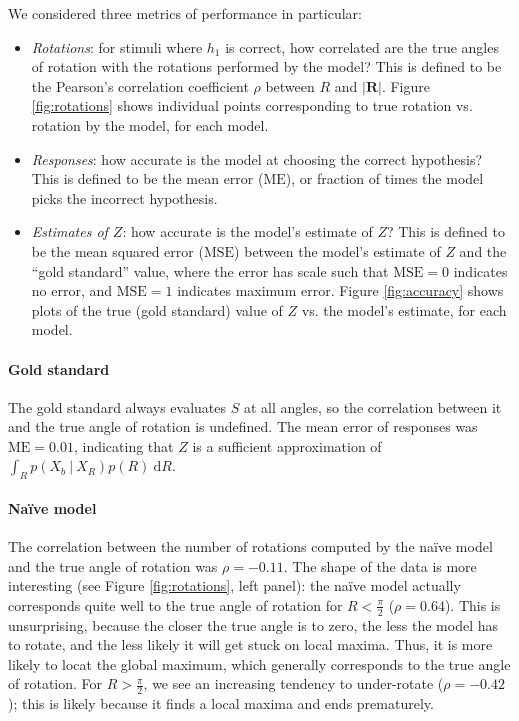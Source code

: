\documentclass{article} %
\newcommand{\MSE}[0]{\mathrm{MSE}}
\newcommand{\ME}[0]{\mathrm{ME}}
\newcommand{\naive}[0]{na\"ive}
\newcommand{\Naive}[0]{Na\"ive}
\begin{document}
We considered three metrics of performance in particular:
\begin{itemize}
\item \textit{Rotations}: for stimuli where $h_1$ is correct, how
  correlated are the true angles of rotation with the rotations
  performed by the model? This is defined to be the Pearson's
  correlation coefficient $\rho$ between $R$ and $\vert
  \mathbf{R}\vert$. Figure \ref{fig:rotations} shows individual points
  corresponding to true rotation vs. rotation by the model, for each
  model.
\item \textit{Responses}: how accurate is the model at choosing the
  correct hypothesis? This is defined to be the mean error ($\ME{}$),
  or fraction of times the model picks the incorrect hypothesis.
\item \textit{Estimates of $Z$}: how accurate is the model's estimate
  of $Z$? This is defined to be the mean squared error ($\MSE{}$)
  between the model's estimate of $Z$ and the ``gold standard'' value,
  where the error has scale such that $\MSE{}=0$ indicates no error,
  and $\MSE{}=1$ indicates maximum error. Figure \ref{fig:accuracy}
  shows plots of the true (gold standard) value of $Z$ vs. the model's
  estimate, for each model.
\end{itemize}

\paragraph{Gold standard} 

The gold standard always evaluates $S$ at all angles, so the
correlation between it and the true angle of rotation is
undefined. The mean error of responses was $\ME{}=0.01$, indicating
that $Z$ is a sufficient approximation of $\int_R p(X_b\ \vert\
X_R)p(R)\ \mathrm{d}R$.

\paragraph{\Naive{} model} 

The correlation between the number of rotations computed by the
\naive{} model and the true angle of rotation was $\rho=-0.11$. The
shape of the data is more interesting (see Figure \ref{fig:rotations},
left panel): the \naive{} model actually corresponds quite well to
the true angle of rotation for $R<\frac{\pi}{2}$ ($\rho=0.64$). This
is unsurprising, because the closer the true angle is to zero, the
less the model has to rotate, and the less likely it will get stuck on
local maxima. Thus, it is more likely to locat the global maximum,
which generally corresponds to the true angle of rotation. For
$R>\frac{\pi}{2}$, we see an increasing tendency to under-rotate
($\rho=-0.42$); this is likely because it finds a local maxima and
ends prematurely.
\end{document}
